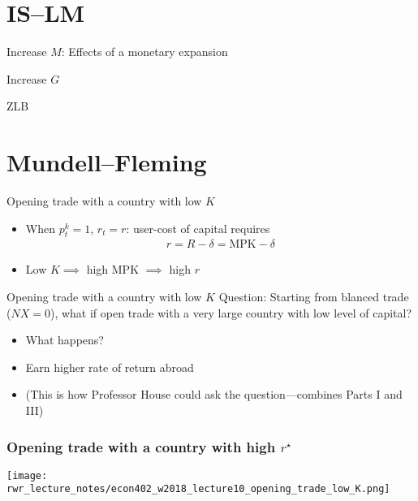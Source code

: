 \documentclass[presentation,dvipsnames]{beamer}
\begin{document}
\section{IS--LM}
\label{sec-5}
\begin{frame}[label=sec-5-1]{Increase $M$: Effects of a monetary expansion}

\end{frame}
\begin{frame}[label=sec-5-2]{Increase $G$}
\end{frame}
\begin{frame}[label=sec-5-3]{ZLB}
\end{frame}
\section{Mundell--Fleming}
\label{sec-6}

\begin{frame}[label=sec-6-1]{Opening trade with a country with low $K$}
\begin{itemize}[label={--}]
\item When $p^{k}_{t} = 1$, $r_{t} = r$: user-cost of capital requires
\begin{align*}
r = R - \delta = \text{MPK} - \delta
\end{align*}
\item Low $K \implies$ high $\text{MPK}$ $\implies$ high $r$
\end{itemize}
\end{frame}

\begin{frame}[label=sec-6-1]{Opening trade with a country with low $K$}
Question: \textcolor{RubineRed}{Starting from blanced trade ($NX = 0$),
what if open trade with a very large country with low level of capital?}
\begin{itemize}[label={--}]
\item What happens?
\item Earn higher rate of return abroad
\item (This is how Professor House could ask the question---combines Parts I and III)
\end{itemize}
\end{frame}

\begin{frame}
\frametitle{Opening trade with a country with high $r^{\star}$}
\centerline{\texttt{[image: rwr\_lecture\_notes/econ402\_w2018\_lecture10\_opening\_trade\_low\_K.png]}}
\end{frame}
\end{document}
